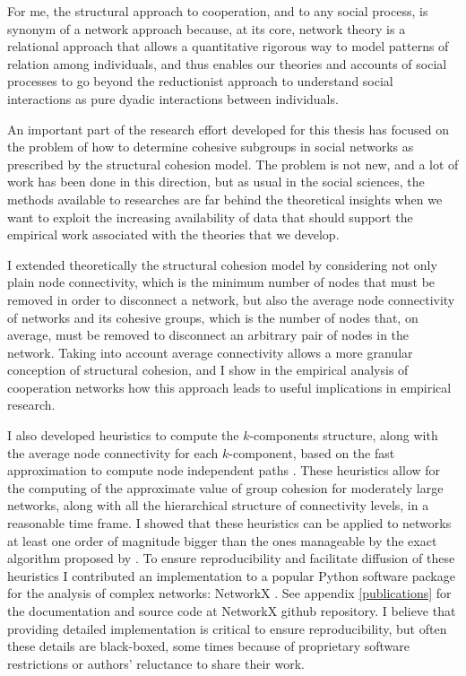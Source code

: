 For me, the structural approach to cooperation, and to any social process, is synonym of a network approach because, at its core, network theory is a relational approach that allows a quantitative rigorous way to model patterns of relation among individuals, and thus enables our theories and accounts of social processes to go beyond the reductionist approach to understand social interactions as pure dyadic interactions between individuals.

An important part of the research effort developed for this thesis has focused on the problem of how to determine cohesive subgroups in social networks as prescribed by the structural cohesion model. The problem is not new, and a lot of work has been done in this direction, but as usual in the social sciences, the methods available to researches are far behind the theoretical insights when we want to exploit the increasing availability of data that should support the empirical work associated with the theories that we develop.

I extended theoretically the structural cohesion model by considering not only plain node connectivity, which is the minimum number of nodes that must be removed in order to disconnect a network, but also the average node connectivity of networks and its cohesive groups, which is the number of nodes that, on average, must be removed to disconnect an arbitrary pair of nodes in the network. Taking into account average connectivity allows a more granular conception of structural cohesion, and I show in the empirical analysis of cooperation networks how this approach leads to useful implications in empirical research.

I also developed heuristics to compute the $k$-components structure, along with the average node connectivity for each $k$-component, based on the fast approximation to compute node independent paths \citep{white:2001b}. These heuristics allow for the computing of the approximate value of group cohesion for moderately large networks, along with all the hierarchical structure of connectivity levels, in a reasonable time frame. I showed that these heuristics can be applied to networks at least one order of magnitude bigger than the ones manageable by the exact algorithm proposed by \citet{moody:2003}. To ensure reproducibility and facilitate diffusion of these heuristics I contributed an implementation to a popular Python software package for the analysis of complex networks: NetworkX \citep{hagberg:2008}. See appendix \ref{publications} for the documentation and source code at NetworkX github repository. I believe that providing detailed implementation is critical to ensure reproducibility, but often these details are black-boxed, some times because of proprietary software restrictions or authors' reluctance to share their work.

